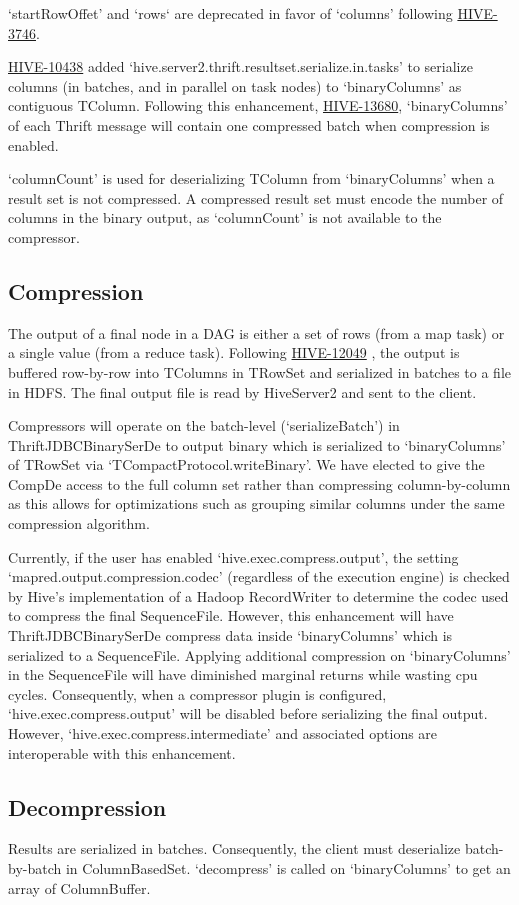 \documentclass[11pt,a4paper]{article}
\begin{document}
		`startRowOffet' and `rows` are deprecated in favor of `columns' following \href{https://issues.apache.org/jira/browse/HIVE-3746}{HIVE-3746}.
		
		\href{https://issues.apache.org/jira/browse/HIVE-10438}{HIVE-10438}
		added `hive.server2.thrift.resultset.serialize.in.tasks' to serialize columns (in batches, and in parallel on task nodes) to `binaryColumns' as contiguous TColumn. Following this enhancement, 
		\href{https://issues.apache.org/jira/browse/HIVE-13680}{HIVE-13680},
		`binaryColumns' of each Thrift message will contain one compressed batch when compression is enabled.
		
		`columnCount' is used for deserializing TColumn from `binaryColumns' when a result set is not compressed.
		A compressed result set must encode the number of columns in the binary output, as `columnCount' is not available to the compressor.
		
	\subsection{Compression}
	
		The output of a final node in a DAG is either a set of rows (from a map task) or a single value (from a reduce task).
		Following
		\href{https://issues.apache.org/jira/browse/HIVE-12049}{HIVE-12049}
		, the output is buffered row-by-row into TColumns in TRowSet and serialized in batches to a file in HDFS.
		The final output file is read by HiveServer2 and sent to the client.
		
		Compressors will operate on the batch-level (`serializeBatch') in ThriftJDBCBinarySerDe to output binary which is serialized to `binaryColumns' of TRowSet via `TCompactProtocol.writeBinary'.
		We have elected to give the CompDe access to the full column set rather than compressing column-by-column as this allows for optimizations such as grouping similar columns under the same compression algorithm.
		
		Currently, if the user has enabled `hive.exec.compress.output', the setting `mapred.output.compression.codec' (regardless of the execution engine) is checked by Hive's implementation of a Hadoop RecordWriter to determine the codec used to compress the final SequenceFile.
		However, this enhancement will have ThriftJDBCBinarySerDe compress data inside `binaryColumns' which is serialized to a SequenceFile.
		Applying additional compression on `binaryColumns' in the SequenceFile will have diminished marginal returns while wasting cpu cycles.
		Consequently, when a compressor plugin is configured,  `hive.exec.compress.output' will be disabled before serializing the final output.
		However, `hive.exec.compress.intermediate' and associated options are interoperable with this enhancement.
		
	\subsection{Decompression}
	
		Results are serialized in batches.
		Consequently, the client must deserialize batch-by-batch in ColumnBasedSet.
		`decompress' is called on `binaryColumns' to get an array of ColumnBuffer.
		
\end{document}
